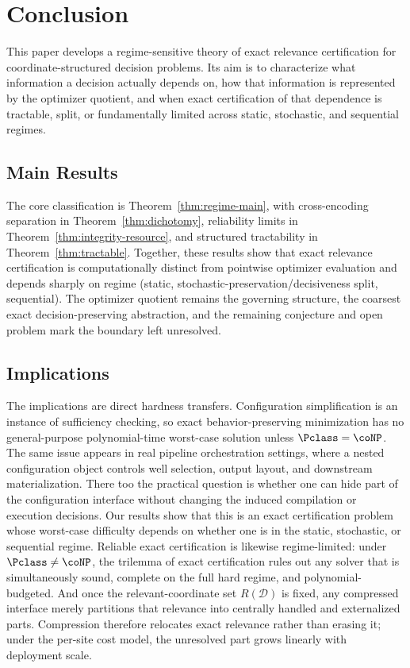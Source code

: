 \section{Conclusion}

This paper develops a regime-sensitive theory of exact relevance certification for coordinate-structured decision problems. Its aim is to characterize what information a decision actually depends on, how that information is represented by the optimizer quotient, and when exact certification of that dependence is tractable, split, or fundamentally limited across static, stochastic, and sequential regimes.

\subsection*{Main Results}

The core classification is Theorem~\ref{thm:regime-main}, with cross-encoding separation in Theorem~\ref{thm:dichotomy}, reliability limits in Theorem~\ref{thm:integrity-resource}, and structured tractability in Theorem~\ref{thm:tractable}.
Together, these results show that exact relevance certification is computationally distinct from pointwise optimizer evaluation and depends sharply on regime (static, stochastic-preservation/decisiveness split, sequential).
The optimizer quotient remains the governing structure, the coarsest exact decision-preserving abstraction, and the remaining conjecture and open problem mark the boundary left unresolved.

\subsection*{Implications}

The implications are direct hardness transfers. Configuration simplification is an instance of sufficiency checking, so exact behavior-preserving minimization has no general-purpose polynomial-time worst-case solution unless $\Pclass=\coNP$. The same issue appears in real pipeline orchestration settings, where a nested configuration object controls well selection, output layout, and downstream materialization. There too the practical question is whether one can hide part of the configuration interface without changing the induced compilation or execution decisions. Our results show that this is an exact certification problem whose worst-case difficulty depends on whether one is in the static, stochastic, or sequential regime. Reliable exact certification is likewise regime-limited: under $\Pclass\neq\coNP$, the trilemma of exact certification rules out any solver that is simultaneously sound, complete on the full hard regime, and polynomial-budgeted. And once the relevant-coordinate set $R(\mathcal{D})$ is fixed, any compressed interface merely partitions that relevance into centrally handled and externalized parts. Compression therefore relocates exact relevance rather than erasing it; under the per-site cost model, the unresolved part grows linearly with deployment scale.

